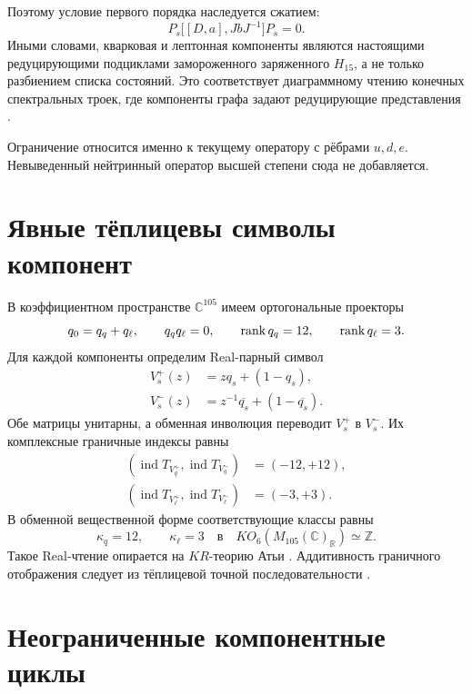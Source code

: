 Поэтому условие первого порядка наследуется сжатием:
\begin{equation}
 P_s\bigl[[D,a],JbJ^{-1}\bigr]P_s=0.
\end{equation}
Иными словами, кварковая и лептонная компоненты являются настоящими
редуцирующими подциклами замороженного заряженного $H_{15}$, а не только
разбиением списка состояний. Это соответствует диаграммному чтению
конечных спектральных троек, где компоненты графа задают редуцирующие
представления \cite{component-boundary-krajewski1998}.

Ограничение относится именно к текущему оператору с рёбрами $u,d,e$.
Невыведенный нейтринный оператор высшей степени сюда не добавляется.

\section{Явные тёплицевы символы компонент}

В коэффициентном пространстве $\mathbb C^{105}$ имеем ортогональные
проекторы
\begin{equation}
 q_0=q_q+q_\ell,
 \qquad
 q_qq_\ell=0,
 \qquad
 \operatorname{rank} q_q=12,
 \qquad
 \operatorname{rank} q_\ell=3.
\end{equation}
Для каждой компоненты определим Real-парный символ
\begin{align}
 V_s^+(z)&=zq_s+(1-q_s),\\
 V_s^-(z)&=z^{-1}\overline{q_s}+(1-\overline{q_s}).
 \label{eq:v6-component-boundary-ko7-symbol}
\end{align}
Обе матрицы унитарны, а обменная инволюция переводит $V_s^+$ в $V_s^-$.
Их комплексные граничные индексы равны
\begin{align}
 (\operatorname{ind}T_{V_q^+},\operatorname{ind}T_{V_q^-})&=(-12,+12),\\
 (\operatorname{ind}T_{V_\ell^+},\operatorname{ind}T_{V_\ell^-})&=(-3,+3).
\end{align}
В обменной вещественной форме соответствующие классы равны
\begin{equation}
 \kappa_q=12,
 \qquad
 \kappa_\ell=3
 \quad\text{в}\quad
 KO_6(M_{105}(\mathbb C)_{\mathbb R})\simeq\mathbb Z.
\end{equation}
Такое Real-чтение опирается на $KR$-теорию Атьи
\cite{component-boundary-atiyah1966}. Аддитивность граничного отображения
следует из тёплицевой точной последовательности
\cite{component-boundary-pimsner-voiculescu1980}.

\section{Неограниченные компонентные циклы}

